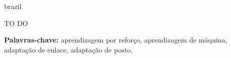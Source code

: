 \begin{resumo}[Resumo]
\begin{otherlanguage*}{brazil}

\setlength\parindent{24pt}
TO DO
%
%
%
%

\vspace*{2ex}
\textbf{Palavras-chave: } aprendizagem por reforço, aprendizagem de máquina, adaptação de enlace, adaptação de posto.

\end{otherlanguage*}
\end{resumo}
